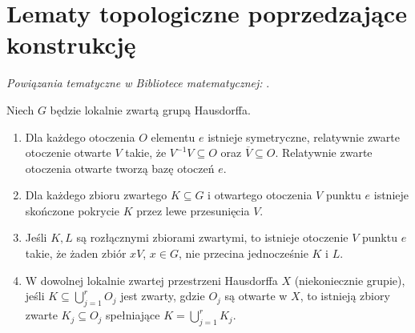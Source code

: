 \section{Lematy topologiczne poprzedzające konstrukcję}

\noindent\emph{Powiązania tematyczne w Bibliotece matematycznej:} .

\begin{lemat}
\label{lem:haar-neigh-23}
Niech $G$ będzie lokalnie zwartą grupą Hausdorffa.
\begin{enumerate}[label=(\roman*)]
\item Dla każdego otoczenia $O$ elementu $e$ istnieje symetryczne,
  relatywnie zwarte otoczenie otwarte $V$ takie, że
  $V^{-1}V\subseteq O$ oraz $\overline V\subseteq O$.
  Relatywnie zwarte otoczenia otwarte
  tworzą bazę otoczeń $e$.
\item Dla każdego zbioru zwartego $K\subseteq G$ i otwartego otoczenia
  $V$ punktu $e$ istnieje skończone pokrycie $K$
  przez lewe przesunięcia $V$.
\item Jeśli $K,L$ są rozłącznymi zbiorami zwartymi, to istnieje otoczenie
  $V$ punktu $e$ takie, że żaden zbiór $xV$, $x\in G$,
  nie przecina jednocześnie $K$ i $L$.
\item W dowolnej lokalnie zwartej przestrzeni Hausdorffa
  $X$ (niekoniecznie grupie), jeśli
  $K\subseteq\bigcup_{j=1}^r O_j$ jest zwarty,
  gdzie $O_j$ są otwarte w $X$, to istnieją zbiory zwarte
  $K_j\subseteq O_j$ spełniające $K=\bigcup_{j=1}^rK_j$.
\end{enumerate}
\end{lemat}
